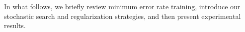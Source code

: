 \documentclass[11pt,tightenlines,kern-1pt]{article}
\begin{document}
In what follows, we briefly review minimum error rate training, introduce our stochastic search and regularization strategies, and then present experimental results. 






\end{document}
